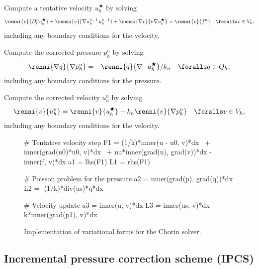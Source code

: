 {
\item
  Compute a tentative velocity $u_h^\bigstar$ by solving
  \begin{equation}\label{eq:chorin,1}
    \renni{v}{D_t^n u_h^\bigstar}
    + \renni{v}{\nabla u_h^{n-1} \, u_h^{n-1}}
    + \renni{\nabla v}{\nu \nabla u_h^{\bigstar}}
    = \renni{v}{f^n} \quad \foralls v \in V_h,
  \end{equation}
  including any boundary conditions for the velocity.

\item
  Compute the corrected pressure $p_h^n$ by solving
  \begin{equation}\label{eq:chorin,2}
    \renni{\nabla q}{\nabla p_h^n}
    = -\renni{q}{\nabla \cdot u_h^{\bigstar}} / k_n \quad \foralls q \in Q_h,
  \end{equation}
  including any boundary conditions for the pressure.

\item
  Compute the corrected velocity $u_h^n$ by solving
  \begin{equation}\label{eq:chorin,3}
    \renni{v}{u_h^n} = \renni{v}{u_h^{\bigstar}} - k_n \renni{v}{\nabla p_h^n}
    \quad \foralls v \in V_h,
  \end{equation}
  including any boundary conditions for the velocity.
}

\begin{figure}
  \begin{center}
    \begin{python}
# Tentative velocity step
F1 = (1/k)*inner(u - u0, v)*dx \
   + inner(grad(u0)*u0, v)*dx \
   + nu*inner(grad(u), grad(v))*dx - inner(f, v)*dx
a1 = lhs(F1)
L1 = rhs(F1)

# Poisson problem for the pressure
a2 = inner(grad(p), grad(q))*dx
L2 = -(1/k)*div(us)*q*dx

# Velocity update
a3 = inner(u, v)*dx
L3 = inner(us, v)*dx - k*inner(grad(p1), v)*dx
    \end{python}
    \caption{Implementation of variational forms for the Chorin solver.}
    \label{fig:chorin_code}
  \end{center}
\end{figure}

\subsection{Incremental pressure correction scheme (IPCS)}
\label{sec:ipcs}

